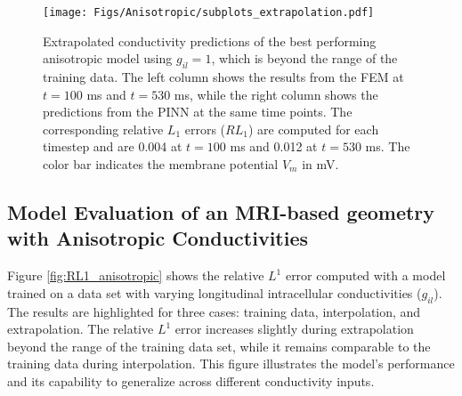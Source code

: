 \begin{figure}[H]
  \centering
  \texttt{[image: Figs/Anisotropic/subplots\_extrapolation.pdf]}
  \caption{Extrapolated conductivity predictions of the best performing anisotropic model using \( g_{il} = 1 \), which is beyond the range of the training data. The left column shows the results from the FEM at \( t = 100 \) ms and \( t = 530 \) ms, while the right column shows the predictions from the PINN at the same time points. The corresponding relative \( L_1 \) errors (\( RL_1 \)) are computed for each timestep and are 0.004 at \( t = 100 \) ms and 0.012 at \( t = 530 \) ms. The color bar indicates the membrane potential \( V_m \) in mV.}
  \label{fig:MRI_extrapolation}
\end{figure}



\subsection{Model Evaluation of an MRI-based geometry with Anisotropic Conductivities}

Figure \ref{fig:RL1_anisotropic} shows the relative $L^1$ error computed with a model trained on a data set with varying longitudinal intracellular conductivities ($g_{il}$). The results are highlighted for three cases: training data, interpolation, and extrapolation. The relative $L^1$ error increases slightly during extrapolation beyond the range of the training data set, while it remains comparable to the training data during interpolation. This figure illustrates the model's performance and its capability to generalize across different conductivity inputs.


